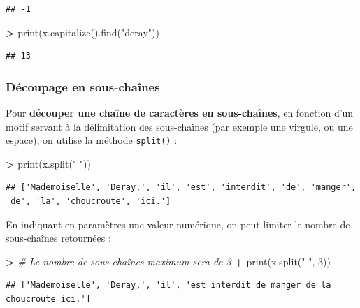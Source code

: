 \documentclass[12pt,]{book}
\newenvironment{Shaded}{\begin{snugshade}}{\end{snugshade}}
\newcommand{\DecValTok}[1]{\textcolor[rgb]{0.00,0.00,0.81}{#1}}
\newcommand{\StringTok}[1]{\textcolor[rgb]{0.31,0.60,0.02}{#1}}
\newcommand{\CommentTok}[1]{\textcolor[rgb]{0.56,0.35,0.01}{\textit{#1}}}
\newcommand{\OperatorTok}[1]{\textcolor[rgb]{0.81,0.36,0.00}{\textbf{#1}}}
\newcommand{\BuiltInTok}[1]{#1}
\newcommand{\NormalTok}[1]{#1}
\numberwithin{equation}{section}
\numberwithin{countremarque}{section}
\begin{document}
\begin{lstlisting}
## -1
\end{lstlisting}

\begin{Shaded}
\begin{Highlighting}[]
\OperatorTok{>} \BuiltInTok{print}\NormalTok{(x.capitalize().find(}\StringTok{"deray"}\NormalTok{))}
\end{Highlighting}
\end{Shaded}

\begin{lstlisting}
## 13
\end{lstlisting}

\subsubsection{Découpage en
sous-chaînes}\label{decoupage-en-sous-chaines}

Pour \textbf{découper une chaîne de caractères en sous-chaînes}, en
fonction d'un motif servant à la délimitation des sous-chaînes (par
exemple une virgule, ou une espace), on utilise la méthode
\texttt{split()} :

\begin{Shaded}
\begin{Highlighting}[]
\OperatorTok{>} \BuiltInTok{print}\NormalTok{(x.split(}\StringTok{" "}\NormalTok{))}
\end{Highlighting}
\end{Shaded}

\begin{lstlisting}
## ['Mademoiselle', 'Deray,', 'il', 'est', 'interdit', 'de', 'manger', 'de', 'la', 'choucroute', 'ici.']
\end{lstlisting}

En indiquant en paramètres une valeur numérique, on peut limiter le
nombre de sous-chaînes retournées :

\begin{Shaded}
\begin{Highlighting}[]
\OperatorTok{>} \CommentTok{# Le nombre de sous-chaînes maximum sera de 3}
\OperatorTok{+} \BuiltInTok{print}\NormalTok{(x.split(}\StringTok{" "}\NormalTok{, }\DecValTok{3}\NormalTok{))}
\end{Highlighting}
\end{Shaded}

\begin{lstlisting}
## ['Mademoiselle', 'Deray,', 'il', 'est interdit de manger de la choucroute ici.']
\end{lstlisting}
\end{document}
